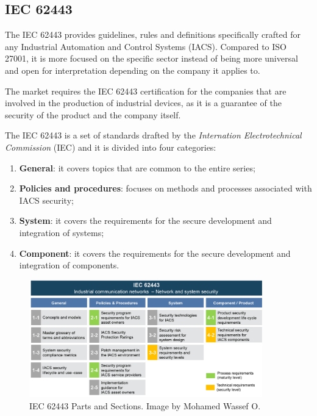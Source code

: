 \subsection{IEC 62443}
\label{sec:iec-62443}

The IEC 62443 provides guidelines, rules and definitions specifically crafted for any Industrial Automation and Control Systems (IACS). Compared to ISO 27001, it is more focused on the specific sector instead of being more universal and open for interpretation depending on the company it applies to.

The market requires the IEC 62443 certification for the companies that are involved in the production of industrial devices, as it is a guarantee of the security of the product and the company itself.

The IEC 62443 is a set of standards drafted by the \textit{Internation Electrotechnical Commission} (IEC) and it is divided into four categories:~\cite{understanding-iec-62443-parts}
\begin{enumerate}
  \item \textbf{General}: it covers topics that are common to the entire series;
  \item \textbf{Policies and procedures}: focuses on methods and processes associated with IACS security;
  \item \textbf{System}: it covers the requirements for the secure development and integration of systems;
  \item \textbf{Component}: it covers the requirements for the secure development and integration of components.
\end{enumerate}

\begin{figure}[t]
  \centering
  \includegraphics[width=0.9\textwidth]{chapters/03/assets/iec62443.png}
  \caption[IEC 62443 Parts and Sections. Image by Mohamed Wassef O. \protect\footnotemark]{IEC 62443 Parts and Sections. Image by Mohamed Wassef O. \protect\footnotemark}
  \label{fig:iec-62443}
\end{figure}

